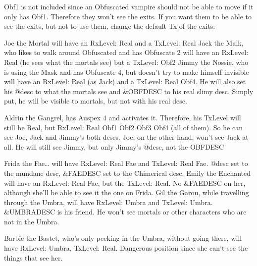 \documentclass[letterpaper,10pt,english]{sphinxmanual}
\begin{document}
\begin{sphinxVerbatim}[commandchars=\\\{\}]
 
 
\end{sphinxVerbatim}

\sphinxAtStartPar
Obf1 is not included since an Obfuscated vampire should not be able to move
if it only has Obf1. Therefore they won’t see the exits. If you want them
to be able to see the exits, but not to use them, change the default Tx of
the exits:

\begin{sphinxVerbatim}[commandchars=\\\{\}]
 
 
\end{sphinxVerbatim}

\sphinxAtStartPar
Joe the Mortal will have an RxLevel: Real and a TxLevel: Real
Jack the Malk, who likes to walk around Obfuscated and has Obfuscate 2 will
have an RxLevel: Real (he sees what the mortals see) but a TxLevel: Obf2
Jimmy the Nossie, who is using the Mask and has Obfuscate 4, but doesn’t
try to make himself invisible will have an RxLevel: Real (as Jack)
and a TxLevel: Real Obf4. He will also set his @desc to what the mortals see and
\&OBFDESC to his real slimy desc. Simply put, he will be visible to mortals,
but not with his real desc.

\sphinxAtStartPar
Aldrin the Gangrel, has Auspex 4 and activates it. Therefore, his TxLevel
will still be Real, but RxLevel: Real Obf1 Obf2 Obf3 Obf4 (all of them). So
he can see Joe, Jack and Jimmy’s both descs.
Joe, on the other hand, won’t see Jack at all. He will still see Jimmy, but
only Jimmy’s @desc, not the OBFDESC

\sphinxAtStartPar
Frida the Fae… will have RxLevel: Real Fae and TxLevel: Real Fae. @desc
set to the mundane desc, \&FAEDESC set to the Chimerical desc.
Emily the Enchanted will have an RxLevel: Real Fae, but the TxLevel: Real.
No \&FAEDESC on her, although she’ll be able to see it the one on Frida.
Gil the Garou, while travelling through the Umbra, will have RxLevel: Umbra
and TxLevel: Umbra. \&UMBRADESC is his friend. He won’t see mortals or other
characters who are not in the Umbra.

\sphinxAtStartPar
Barbie the Bastet, who’s only peeking in the Umbra, without going there,
will have RxLevel: Umbra, TxLevel: Real. Dangerous position since she
can’t see the things that see her.
\end{document}
